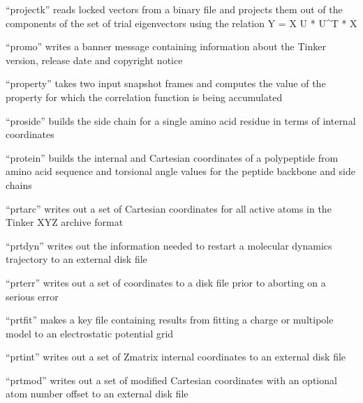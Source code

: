 \documentclass[letterpaper,11pt,english]{sphinxmanual}
\begin{document}

“projectk” reads locked vectors from a binary file and projects
them out of the components of the set of trial eigenvectors
using the relation Y = X \sphinxhyphen{} U * U\textasciicircum{}T * X


“promo” writes a banner message containing information
about the Tinker version, release date and copyright notice


“property” takes two input snapshot frames and computes the
value of the property for which the correlation function is
being accumulated


“proside” builds the side chain for a single amino acid
residue in terms of internal coordinates


“protein” builds the internal and Cartesian coordinates
of a polypeptide from amino acid sequence and torsional
angle values for the peptide backbone and side chains


“prtarc” writes out a set of Cartesian coordinates for
all active atoms in the Tinker XYZ archive format


“prtdyn” writes out the information needed to restart a
molecular dynamics trajectory to an external disk file


“prterr” writes out a set of coordinates to a disk
file prior to aborting on a serious error


“prtfit” makes a key file containing results from fitting a
charge or multipole model to an electrostatic potential grid


“prtint” writes out a set of Z\sphinxhyphen{}matrix internal
coordinates to an external disk file


“prtmod” writes out a set of modified Cartesian coordinates
with an optional atom number offset to an external disk file
\end{document}
